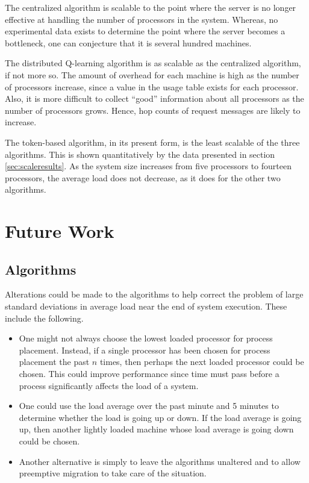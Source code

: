 \documentclass{report}
\begin{document}
The centralized algorithm is scalable to the point where the server is no
longer effective at handling the number of processors in the system.
Whereas, no experimental data exists to determine the point where the server
becomes a bottleneck, one can conjecture that it is several hundred machines.

The distributed Q-learning algorithm is as scalable as the centralized
algorithm, if not more so.  The amount of overhead for each machine is high
as the number of processors increase, since a value in the usage table
exists for each processor.  Also, it is more difficult to collect ``good''
information about all processors as the number of processors grows.  Hence,
hop counts of request messages are likely to increase.

The token-based algorithm, in its present form, is the least scalable of the
three algorithms.  This is shown quantitatively by the data presented in
section \ref{sec:scaleresults}.  As the system size increases from five
processors to fourteen processors, the average load does not decrease, as
it does for the other two algorithms.

\section{Future Work}

\subsection{Algorithms}

Alterations could be made to the algorithms to help correct the problem of
large standard deviations in average load near the end of system execution.
These include the following.

\begin{itemize}
	\item One might not always choose the lowest loaded processor for
process placement.  Instead, if a single processor has been chosen for
process placement the past $n$ times, then perhaps the next loaded processor
could be chosen.  This could improve performance since time must pass before
a process significantly affects the load of a system.

	\item One could use the load average over the past minute and 5
minutes to determine whether the load is going up or down.  If the load
average is going up, then another lightly loaded machine whose load average
is going down could be chosen.

	\item Another alternative is simply to leave the algorithms
unaltered and to allow preemptive migration to take care of the situation.
\end{itemize}
\end{document}
